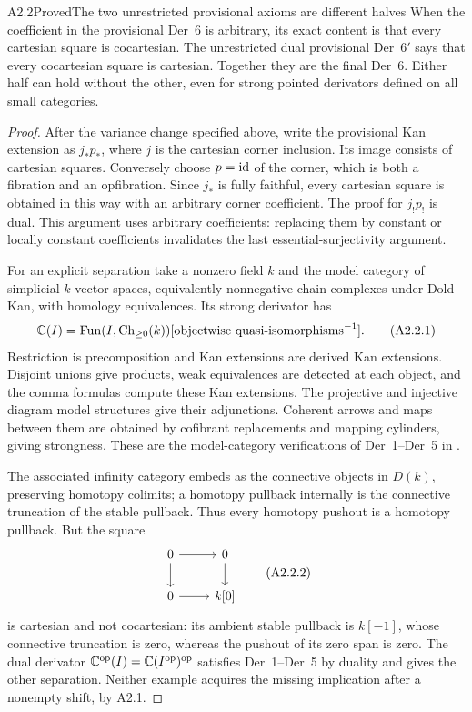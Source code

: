\begin{claim}{A2.2}{Proved}{The two unrestricted provisional axioms are different halves}
\label{A2-provisional}
When the coefficient in the provisional Der~6 is arbitrary, its exact content
is that every cartesian square is cocartesian. The unrestricted dual
provisional Der~$6'$ says that every cocartesian square is cartesian. Together
they are the final Der~6. Either half can hold without the other, even for
strong pointed derivators defined on all small categories.
\end{claim}
\begin{proof}
After the variance change specified above, write the provisional Kan
extension as $j_*p_*$, where $j$ is the cartesian corner inclusion. Its image
consists of cartesian squares. Conversely choose $p=\operatorname{id}$ of the corner,
which is both a fibration and an opfibration. Since $j_*$ is fully faithful,
every cartesian square is obtained in this way with an arbitrary corner
coefficient. The proof for $j_!p_!$ is dual. This argument uses arbitrary
coefficients: replacing them by constant or locally constant coefficients
invalidates the last essential-surjectivity argument.

For an explicit separation take a nonzero field $k$ and the model category
of simplicial $k$-vector spaces, equivalently nonnegative chain complexes
under Dold--Kan, with homology equivalences. Its strong derivator has
\[
 \mathbb C(I)=\operatorname{Fun}(I,\operatorname{Ch}_{\ge0}(k))
                   [\text{objectwise quasi-isomorphisms}^{-1}].
 \tag{A2.2.1}
\]
Restriction is precomposition and Kan extensions are derived Kan extensions.
Disjoint unions give products, weak equivalences are detected at each object,
and the comma formulas compute these Kan extensions. The projective and
injective diagram model structures give their adjunctions. Coherent arrows
and maps between them are obtained by cofibrant replacements and mapping
cylinders, giving strongness. These are the model-category verifications of
Der~1--Der~5 in \cite[Theorem~1.34, Proposition~1.36 and Theorem~1.38]{A2GrothPreprint}.

The associated infinity category embeds as the connective objects in
$D(k)$, preserving homotopy colimits; a homotopy pullback internally is the
connective truncation of the stable pullback. Thus every homotopy pushout is
a homotopy pullback. But the square
\[
 \begin{tikzcd}
 0\ar[r]\ar[d]&0\ar[d]\\
 0\ar[r]&k[0]
 \end{tikzcd}
 \tag{A2.2.2}
\]
is cartesian and not cocartesian: its ambient stable pullback is $k[-1]$,
whose connective truncation is zero, whereas the pushout of its zero span
is zero. The dual derivator
$\mathbb C^{\mathrm{op}}(I)=\mathbb C(I^{\mathrm{op}})^{\mathrm{op}}$ satisfies Der~1--Der~5
by duality and gives the other separation. Neither example acquires the
missing implication after a nonempty shift, by A2.1.


\end{proof}
